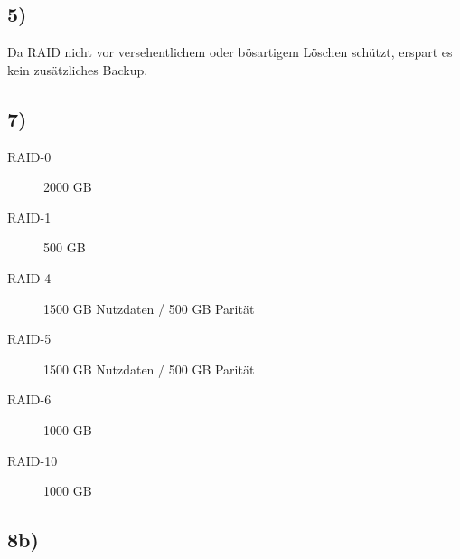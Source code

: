 \documentclass[ngerman]{fbi-aufgabenblatt}
\begin{document}
\subsection*{5)}
Da RAID nicht vor versehentlichem oder bösartigem Löschen schützt, erspart es kein zusätzliches Backup.

\subsection*{7)}
\begin{description}
	\item[RAID-0] 2000 GB
	\item [RAID-1] 500 GB
	\item [RAID-4] 1500 GB Nutzdaten / 500 GB Parität
	\item [RAID-5] 1500 GB Nutzdaten / 500 GB Parität
	\item [RAID-6] 1000 GB
	\item[RAID-10] 1000 GB
\end{description} 

\subsection*{8b)}
\end{document}
